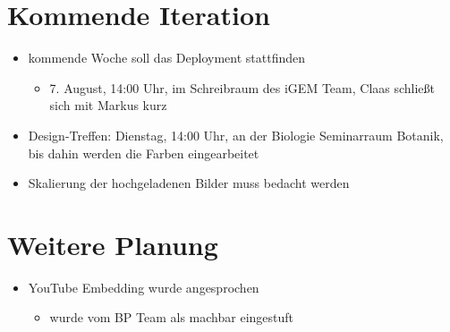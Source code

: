 \documentclass[colorback, accentcolor=tud1c, paper=a4]{tudexercise}
\begin{document}
\begin{multicols}{2}
\section*{Kommende Iteration}
\begin{itemize}
	\item kommende Woche soll das Deployment stattfinden
	\begin{itemize}
		\item 7. August, 14:00 Uhr, im Schreibraum des iGEM Team, Claas schließt sich mit Markus kurz
	\end{itemize}
	\item Design-Treffen: Dienstag, 14:00 Uhr, an der Biologie Seminarraum Botanik, bis dahin werden die Farben eingearbeitet
	\item Skalierung der hochgeladenen Bilder muss bedacht werden
\end{itemize}

\section*{Weitere Planung}
\begin{itemize}
	\item YouTube Embedding wurde angesprochen
	\begin{itemize}
		\item wurde vom BP Team als machbar eingestuft
	\end{itemize}
\end{itemize}

\end{multicols}
\end{document}
